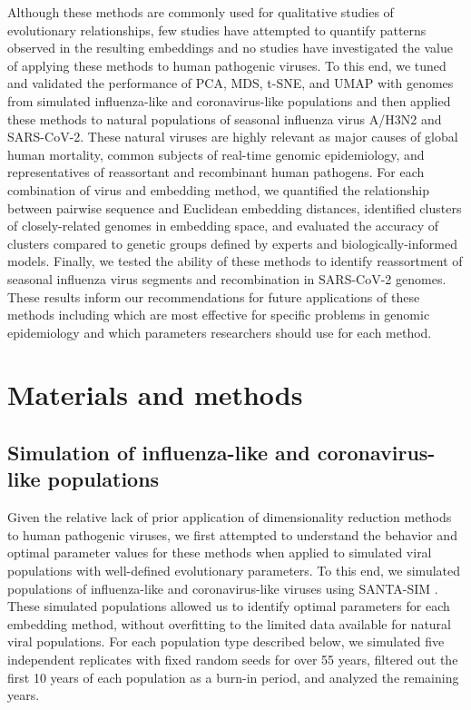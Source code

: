 \documentclass[10pt,letterpaper]{article}
\begin{document}
Although these methods are commonly used for qualitative studies of evolutionary relationships, few studies have attempted to quantify patterns observed in the resulting embeddings and no studies have investigated the value of applying these methods to human pathogenic viruses.
To this end, we tuned and validated the performance of PCA, MDS, t-SNE, and UMAP with genomes from simulated influenza-like and coronavirus-like populations and then applied these methods to natural populations of seasonal influenza virus A/H3N2 and SARS-CoV-2.
These natural viruses are highly relevant as major causes of global human mortality, common subjects of real-time genomic epidemiology, and representatives of reassortant and recombinant human pathogens.
For each combination of virus and embedding method, we quantified the relationship between pairwise sequence and Euclidean embedding distances, identified clusters of closely-related genomes in embedding space, and evaluated the accuracy of clusters compared to genetic groups defined by experts and biologically-informed models.
Finally, we tested the ability of these methods to identify reassortment of seasonal influenza virus segments and recombination in SARS-CoV-2 genomes.
These results inform our recommendations for future applications of these methods including which are most effective for specific problems in genomic epidemiology and which parameters researchers should use for each method.

\section*{Materials and methods}

\subsection*{Simulation of influenza-like and coronavirus-like populations}

Given the relative lack of prior application of dimensionality reduction methods to human pathogenic viruses, we first attempted to understand the behavior and optimal parameter values for these methods when applied to simulated viral populations with well-defined evolutionary parameters.
To this end, we simulated populations of influenza-like and coronavirus-like viruses using SANTA-SIM \cite{Jariani2019}.
These simulated populations allowed us to identify optimal parameters for each embedding method, without overfitting to the limited data available for natural viral populations.
For each population type described below, we simulated five independent replicates with fixed random seeds for over 55 years, filtered out the first 10 years of each population as a burn-in period, and analyzed the remaining years.
\end{document}
